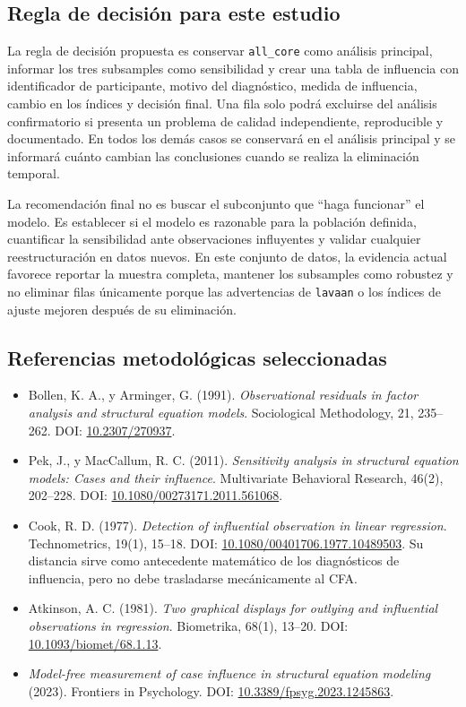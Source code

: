 \documentclass[11pt,a4paper]{article}
\begin{document}
\subsection{Regla de decisión para este estudio}

La regla de decisión propuesta es conservar \texttt{all\_core} como análisis principal, informar los tres subsamples como sensibilidad y crear una tabla de influencia con identificador de participante, motivo del diagnóstico, medida de influencia, cambio en los índices y decisión final. Una fila solo podrá excluirse del análisis confirmatorio si presenta un problema de calidad independiente, reproducible y documentado. En todos los demás casos se conservará en el análisis principal y se informará cuánto cambian las conclusiones cuando se realiza la eliminación temporal.

La recomendación final no es buscar el subconjunto que ``haga funcionar'' el modelo. Es establecer si el modelo es razonable para la población definida, cuantificar la sensibilidad ante observaciones influyentes y validar cualquier reestructuración en datos nuevos. En este conjunto de datos, la evidencia actual favorece reportar la muestra completa, mantener los subsamples como robustez y no eliminar filas únicamente porque las advertencias de \texttt{lavaan} o los índices de ajuste mejoren después de su eliminación.

\subsection{Referencias metodológicas seleccionadas}

\begin{itemize}[leftmargin=*]
  \item Bollen, K. A., y Arminger, G. (1991). \textit{Observational residuals in factor analysis and structural equation models}. Sociological Methodology, 21, 235--262. DOI: \href{https://doi.org/10.2307/270937}{10.2307/270937}.
  \item Pek, J., y MacCallum, R. C. (2011). \textit{Sensitivity analysis in structural equation models: Cases and their influence}. Multivariate Behavioral Research, 46(2), 202--228. DOI: \href{https://doi.org/10.1080/00273171.2011.561068}{10.1080/00273171.2011.561068}.
  \item Cook, R. D. (1977). \textit{Detection of influential observation in linear regression}. Technometrics, 19(1), 15--18. DOI: \href{https://doi.org/10.1080/00401706.1977.10489503}{10.1080/00401706.1977.10489503}. Su distancia sirve como antecedente matemático de los diagnósticos de influencia, pero no debe trasladarse mecánicamente al CFA.
  \item Atkinson, A. C. (1981). \textit{Two graphical displays for outlying and influential observations in regression}. Biometrika, 68(1), 13--20. DOI: \href{https://doi.org/10.1093/biomet/68.1.13}{10.1093/biomet/68.1.13}.
  \item \textit{Model-free measurement of case influence in structural equation modeling} (2023). Frontiers in Psychology. DOI: \href{https://doi.org/10.3389/fpsyg.2023.1245863}{10.3389/fpsyg.2023.1245863}.
\end{itemize}
\end{document}
